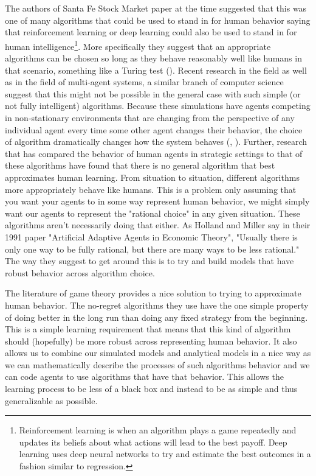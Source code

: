 \documentclass[12pt,twoside]{reedthesis}
\begin{document}
The authors of Santa Fe Stock Market paper at the time suggested that this was one of many algorithms that could be used to stand in for human behavior saying that reinforcement learning or deep learning could also be used to stand in for human intelligence\footnote{Reinforcement learning is when an algorithm plays a game repeatedly and updates its beliefs about what actions will lead to the best payoff. Deep learning uses deep neural networks to try and estimate the best outcomes in a fashion similar to regression.}. More specifically they suggest that an appropriate algorithms can be chosen so long as they behave reasonably well like humans in that scenario, something like a Turing test (\cite{Arthur1991}). Recent research in the field as well as in the field of multi-agent systems, a similar branch of computer science suggest that this might not be possible in the general case with such simple (or not fully intelligent) algorithms. Because these simulations have agents competing in non-stationary environments that are changing from the perspective of any individual agent every time some other agent changes their behavior, the choice of algorithm dramatically changes how the system behaves (\cite{Rejeb2005}, \cite{Shoham2008}). Further, research that has compared the behavior of human agents in strategic settings to that of these algorithms have found that there is no general algorithm that best approximates human learning\citep{Tesfatsion2002}. From situation to situation, different algorithms more appropriately behave like humans. This is a problem only assuming that you want your agents to in some way represent human behavior, we might simply want our agents to represent the "rational choice" in any given situation. These algorithms aren't necessarily doing that either. As Holland and Miller say in their 1991 paper "Artificial Adaptive Agents in Economic Theory", "Usually there is only one way to be fully rational, but there are many ways to be less rational." The way they suggest to get around this is to try and build models that have robust behavior across algorithm choice.

The literature of game theory provides a nice solution to trying to approximate human behavior. The no-regret algorithms they use have the one simple property of doing better in the long run than doing any fixed strategy from the beginning. This is a simple learning requirement that means that this kind of algorithm should (hopefully) be more robust across representing human behavior. It also allows us to combine our simulated models and analytical models in a nice way as we can mathematically describe the processes of such algorithms behavior and we can code agents to use algorithms that have that behavior. This allows the learning process to be less of a black box and instead to be as simple and thus generalizable as possible.
\end{document}
